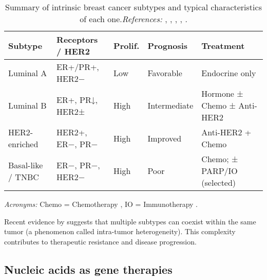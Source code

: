 \renewcommand{\arraystretch}{1.3}
\begin{table}[h]
  \centering
  \small
  \caption{Summary of intrinsic breast cancer subtypes and typical characteristics of each one.\newline\textit{References:} \cite{clinical_implication_bca_Adamo2015}, \cite{diff_bca_usa_Howlader2018}, \cite{bc_subtypes_Prat2015Clinical}, \cite{updatedbca_Hong2022Breast}, \cite{tnbc_therapies_Mahalingam2020The}.}
  \label{tab:bc_subtypes_summary}
  \begin{tabularx}{\textwidth}{l l l l X}
    \toprule
    \textbf{Subtype}  & \textbf{Receptors / HER2} & \textbf{Prolif.} & \textbf{Prognosis} & \textbf{Treatment}          \\
    \midrule
    Luminal A         & ER+/PR+, HER2−            & Low              & Favorable          & Endocrine only              \\
    \midrule
    Luminal B         & ER+, PR↓, HER2±           & High             & Intermediate       & Hormone ± Chemo ± Anti-HER2 \\
    \midrule
    HER2-enriched     & HER2+, ER−, PR−           & High             & Improved           & Anti-HER2 + Chemo           \\
    \midrule
    Basal-like / TNBC & ER−, PR−, HER2−           & High             & Poor               & Chemo; ± PARP/IO (selected) \\

    \bottomrule
  \end{tabularx}

  \vspace{1ex}
  \raggedright
  \footnotesize
  \textit{Acronyms:} Chemo = Chemotherapy , IO = Immunotherapy .
\end{table}

Recent evidence by
\textcite{intratumor_heterogeneity_Yeo2017,origins_and_evolution_bca_Polyak2007}
suggests that multiple subtypes can coexist within the same tumor (a phenomenon
called intra-tumor heterogeneity). This complexity contributes to therapeutic
resistance and disease progression.

\subsection{Nucleic acids as gene therapies}
\label{sec:nucleic_acids_gene_therapies}

